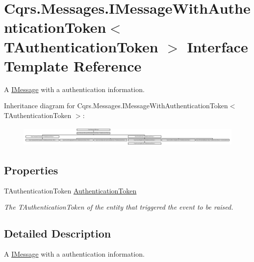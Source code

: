 \hypertarget{interfaceCqrs_1_1Messages_1_1IMessageWithAuthenticationToken}{}\section{Cqrs.\+Messages.\+I\+Message\+With\+Authentication\+Token$<$ T\+Authentication\+Token $>$ Interface Template Reference}
\label{interfaceCqrs_1_1Messages_1_1IMessageWithAuthenticationToken}


A \hyperlink{interfaceCqrs_1_1Messages_1_1IMessage}{I\+Message} with a authentication information.  


Inheritance diagram for Cqrs.\+Messages.\+I\+Message\+With\+Authentication\+Token$<$ T\+Authentication\+Token $>$\+:\begin{figure}[H]
\begin{center}
\leavevmode
\includegraphics[height=1.041667cm]{interfaceCqrs_1_1Messages_1_1IMessageWithAuthenticationToken}
\end{center}
\end{figure}
\subsection*{Properties}
\begin{DoxyCompactItemize}
\item 
T\+Authentication\+Token \hyperlink{interfaceCqrs_1_1Messages_1_1IMessageWithAuthenticationToken_ac80645a12251d6d8766b0ee18e0386f1_ac80645a12251d6d8766b0ee18e0386f1}{Authentication\+Token}
\begin{DoxyCompactList}\small\item\em The {\itshape T\+Authentication\+Token}  of the entity that triggered the event to be raised. \end{DoxyCompactList}\end{DoxyCompactItemize}


\subsection{Detailed Description}
A \hyperlink{interfaceCqrs_1_1Messages_1_1IMessage}{I\+Message} with a authentication information. 


